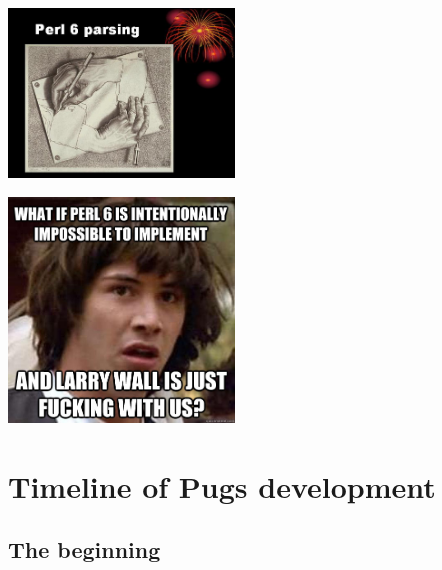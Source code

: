 \documentclass[12pt,compress,english,utf8,t]{beamer}
\begin{document}
\begin{frame}
  \includegraphics[width=0.45\textwidth]{images/perl-6-parsing.jpeg}

  \hfill\includegraphics[width=0.45\textwidth]{images/implementing-perl-6.jpeg}
\end{frame}

\section{Timeline of Pugs development}

\subsection{The beginning}
\end{document}
